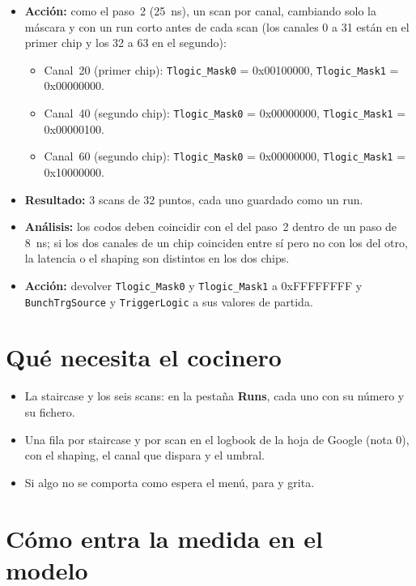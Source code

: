 \documentclass[11pt,a4paper]{article}
\begin{document}
\begin{itemize}
\item {\bf Acción:} como el paso~2 (25~ns), un scan por canal, cambiando
  solo la máscara y con un run corto antes de cada scan (los canales 0 a 31 están en el primer chip y los 32 a 63
  en el segundo):
  \begin{itemize}
  \item Canal~20 (primer chip): \texttt{Tlogic\_Mask0} = 0x00100000,
    \texttt{Tlogic\_Mask1} = 0x00000000.
  \item Canal~40 (segundo chip): \texttt{Tlogic\_Mask0} = 0x00000000,
    \texttt{Tlogic\_Mask1} = 0x00000100.
  \item Canal~60 (segundo chip): \texttt{Tlogic\_Mask0} = 0x00000000,
    \texttt{Tlogic\_Mask1} = 0x10000000.
  \end{itemize}
\item {\bf Resultado:} 3 scans de 32 puntos, cada uno guardado como un run.
\item {\bf Análisis:} los codos deben coincidir con el del paso~2 dentro de
  un paso de 8~ns; si los dos canales de un chip coinciden entre sí pero no
  con los del otro, la latencia o el shaping son distintos en los dos chips.
\end{itemize}

\begin{itemize}
\item {\bf Acción:} devolver \texttt{Tlogic\_Mask0} y \texttt{Tlogic\_Mask1}
  a 0xFFFFFFFF y \texttt{BunchTrgSource} y \texttt{TriggerLogic} a sus
  valores de partida.
\end{itemize}

\section*{Qué necesita el cocinero}

\begin{itemize}
\item La staircase y los seis scans: en la pestaña {\bf Runs}, cada uno
  con su número y su fichero.
\item Una fila por staircase y por scan en el logbook de la hoja de Google
  (nota 0), con el shaping, el canal que dispara y el umbral.
\item Si algo no se comporta como espera el menú, para y grita.
\end{itemize}

\section{Cómo entra la medida en el modelo}
\label{sec:razon}
\end{document}
